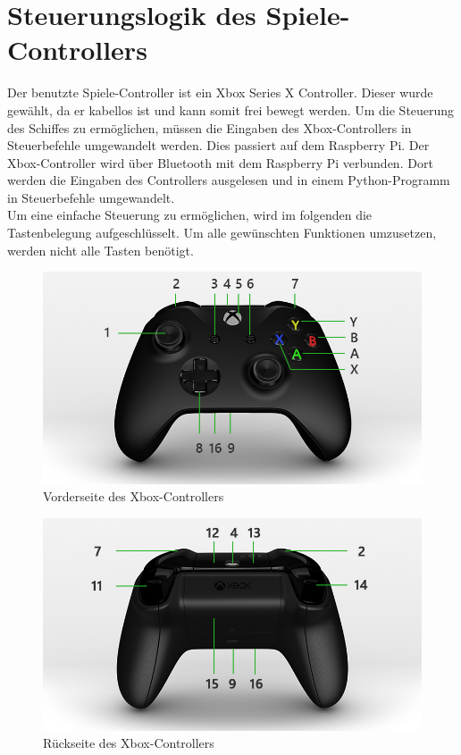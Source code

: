 \section{Steuerungslogik des Spiele-Controllers} \label{sec:steuerungslogik}
Der benutzte Spiele-Controller ist ein Xbox Series X Controller. Dieser wurde gewählt, da er kabellos ist und kann somit frei bewegt werden. 
Um die Steuerung des Schiffes zu
ermöglichen, müssen die Eingaben des Xbox-Controllers in Steuerbefehle umgewandelt werden. Dies passiert auf dem 
Raspberry Pi. Der Xbox-Controller wird über Bluetooth mit dem Raspberry Pi verbunden. Dort werden die Eingaben des Controllers
ausgelesen und in einem Python-Programm in Steuerbefehle umgewandelt. \\
Um eine einfache Steuerung zu ermöglichen, wird im folgenden die Tastenbelegung aufgeschlüsselt.
Um alle gewünschten Funktionen umzusetzen, werden nicht alle Tasten benötigt. 

\begin{figure}[H]
    \centering
    \includegraphics[scale=0.5]{images/vorderseite.jpg}
    \caption{Vorderseite des Xbox-Controllers \cite{XboxController}}
    \label{fig:vorderseite}
\end{figure}

\begin{figure}[H]
    \centering
    \includegraphics[scale=0.5]{images/rueckseite.jpg}
    \caption{Rückseite des Xbox-Controllers \cite{XboxController}}
    \label{fig:rueckseite}
\end{figure}

